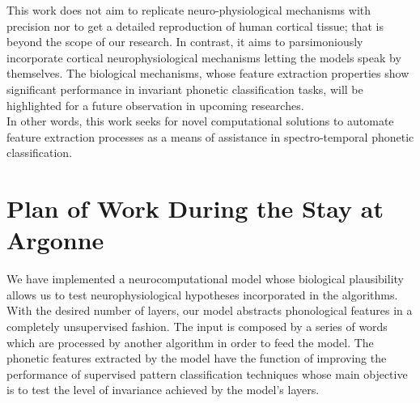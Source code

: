 \documentclass[11pt,a4paper]{article}
\begin{document}
This work does not aim to replicate 
neuro-physiological mechanisms with precision nor to get a detailed reproduction
of human cortical tissue; that is beyond the scope of our research. 
In contrast, it aims to parsimoniously incorporate cortical
neurophysiological mechanisms letting the models
speak by themselves.
The biological mechanisms, whose feature extraction
properties show significant performance
in invariant phonetic classification tasks, will be
highlighted for a future observation in upcoming researches. \\

In other words, this work seeks for novel computational solutions
to automate feature extraction processes as a means
of assistance in spectro-temporal phonetic classification. \\




















\section{Plan of Work During the Stay at Argonne}

We have implemented a neurocomputational model whose biological plausibility
allows us to test neurophysiological hypotheses incorporated in the algorithms.
With the desired number of layers, our model abstracts phonological features
in a completely unsupervised fashion.
The input is composed by a series of words which are processed by another algorithm
in order to feed the model.
The phonetic features extracted by the model have the function of improving
the performance of supervised pattern classification techniques
whose main objective is to test the level of invariance achieved by the model's layers. \\
\end{document}
